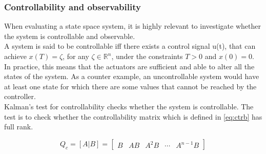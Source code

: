 %
%

\subsubsection{Controllability and observability}
When evaluating a state space system, it is highly relevant to investigate whether the system is controllable and observable. \\
A system is said to be controllable iff there exists a control signal u(t), that can achieve $x(T) = \zeta$, for any $\zeta \in \mathbb{R} ^{n}$, under the constraints $T>0$ and $x(0)=0$. In practice, this means that the actuators are sufficient and able to alter all the states of the system. As a counter example, an uncontrollable system would have at least one state for which there are some values that cannot be reached by the controller.\\
Kalman's test for controllability checks whether the system is controllable. The test is to check whether the controllability matrix which is defined in \cref{eq:ctrb} has full rank.

\begin{equation} \label{eq:ctrb}
	Q_c = [A|B] = \begin{bmatrix}  B & AB & A^2B & \cdots & A^{n-1}B  \end{bmatrix}
\end{equation}

